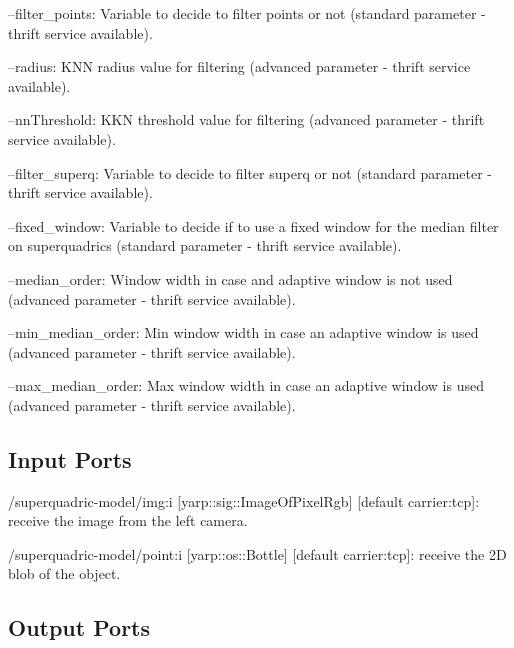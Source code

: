 \begin{DoxyItemize}
\item --filter\+\_\+points\+: Variable to decide to filter points or not (standard parameter -\/ thrift service available).
\item --radius\+: K\+NN radius value for filtering (advanced parameter -\/ thrift service available).
\item --nn\+Threshold\+: K\+KN threshold value for filtering (advanced parameter -\/ thrift service available).
\item --filter\+\_\+superq\+: Variable to decide to filter superq or not (standard parameter -\/ thrift service available).
\item --fixed\+\_\+window\+: Variable to decide if to use a fixed window for the median filter on superquadrics (standard parameter -\/ thrift service available).
\item --median\+\_\+order\+: Window width in case and adaptive window is not used (advanced parameter -\/ thrift service available).
\item --min\+\_\+median\+\_\+order\+: Min window width in case an adaptive window is used (advanced parameter -\/ thrift service available).
\item --max\+\_\+median\+\_\+order\+: Max window width in case an adaptive window is used (advanced parameter -\/ thrift service available). 
\end{DoxyItemize}\hypertarget{group__superquadric-model_inputports_sec}{}\subsection{Input Ports}\label{group__superquadric-model_inputports_sec}

\begin{DoxyItemize}
\item /superquadric-\/model/img\+:i \mbox{[}yarp\+::sig\+::\+Image\+Of\+Pixel\+Rgb\mbox{]} \mbox{[}default carrier\+:tcp\mbox{]}\+: receive the image from the left camera.
\item /superquadric-\/model/point\+:i \mbox{[}yarp\+::os\+::\+Bottle\mbox{]} \mbox{[}default carrier\+:tcp\mbox{]}\+: receive the 2D blob of the object.
\end{DoxyItemize}\hypertarget{group__superquadric-model_outputports_sec}{}\subsection{Output Ports}\label{group__superquadric-model_outputports_sec}

